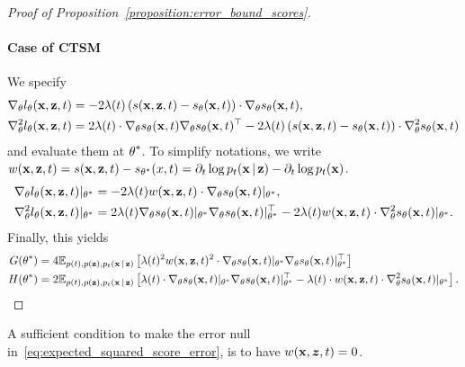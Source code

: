 \begin{proof}[Proof of Proposition~\ref{proposition:error_bound_scores}]
\paragraph{Case of CTSM}
We specify
\begin{align}
    \nabla_{\btheta} l_{\btheta}(\bx, \bz, t)
    &=
    -2 \lambda(t) \left(
    s(\bx, \bz, t) - s_{\btheta}(\bx, t) 
    \right) 
    \cdot
    \nabla_{\btheta} s_{\btheta}(\bx, t),
    \\
    \nabla^2_{\btheta} l_{\btheta}(\bx, \bz, t)
    &=
    2 \lambda(t) 
    \cdot
    \nabla_{\btheta} s_{\btheta}(\bx, t)
    \nabla_{\btheta} s_{\btheta}(\bx, t)^\top
    -
    2 \lambda(t) \left(
    s(\bx, \bz, t) - s_{\btheta}(\bx, t) 
    \right) 
    \cdot
    \nabla^2_{\btheta} s_{\btheta}(\bx, t)
\end{align}
and evaluate them at $\btheta^*$. To simplify notations, we write $w(\bx, \bz, t) = s(\bx, \bz, t) - s_{\btheta^*}(x, t) = \partial_t \log p_t(\bx | \bz) -  \partial_t \log p_t(\bx)$.
\begin{align}
    \nabla_{\btheta} l_{\btheta}(\bx, \bz, t)|_{\btheta^*}
    &=
    -2 \lambda(t) w(\bx, \bz, t) 
    \cdot
    \nabla_{\btheta} s_{\btheta}(\bx, t)|_{\btheta^*},
    \\
    \nabla^2_{\btheta} l_{\btheta}(\bx, \bz, t)|_{\btheta^*}
    &=
    2 \lambda(t)
    \nabla_{\btheta} s_{\btheta}(\bx, t)|_{\btheta^*}
    \nabla_{\btheta} s_{\btheta}(\bx, t)|_{\btheta^*}^\top
    -
    2 \lambda(t) w(\bx, \bz, t)
    \cdot
    \nabla^2_{\btheta} s_{\btheta}(\bx, t)|_{\btheta^*}
    .
\end{align}
Finally, this yields
\begin{align}
    \label{eq:ctsm_matrices}
    G(\btheta^*)
    &=
    4
    \E_{p(t),p(\bz),p_{t}(\bx|\bz)} \left[
    \lambda(t)^2
    w(\bx, \bz, t)^2
    \cdot
    \nabla_{\btheta} s_{\btheta}(\bx, t)|_{\btheta^*}
    \nabla_{\btheta} s_{\btheta}(\bx, t)|_{\btheta^*}^\top    
    \right]
    \\
    H(\btheta^*)
    &=
    2
    \E_{p(t),p(\bz),p_{t}(\bx|\bz)} \left[
    \lambda(t)
    \cdot
    \nabla_{\btheta} s_{\btheta}(\bx, t)|_{\btheta^*}
    \nabla_{\btheta} s_{\btheta}(\bx, t)|_{\btheta^*}^\top
    -
    \lambda(t)
    \cdot
    w(\bx, \bz, t)
    \cdot
    \nabla^2_{\btheta} s_{\btheta}(\bx, t)|_{\btheta^*}
    \right].
\end{align}
\end{proof}

A sufficient condition to make the error null in~\eqref{eq:expected_squared_score_error}, is to have $w(\bx, \vz, t) = 0$.


